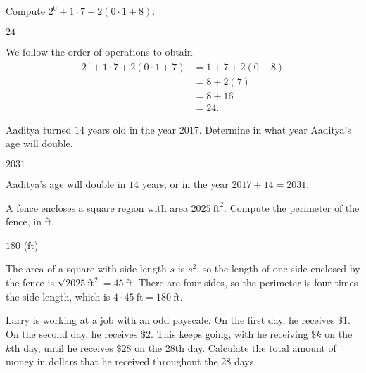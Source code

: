 \documentclass[11pt]{article}
\begin{document}
\setlength{\parindent}{0pt}

\begin{problem}
Compute $2^0 + 1 \cdot 7 + 2(0 \cdot 1 + 8)$.
\end{problem}

\begin{answer}
$\boxed{24}$
\end{answer}

\begin{solution}
We follow the order of operations to obtain
\begin{align*}
2^0 + 1 \cdot 7 + 2(0 \cdot 1 + 7) &= 1 + 7 + 2(0 + 8) \\
&= 8 + 2(7) \\ 
&= 8 + 16 \\
&= \boxed{24}.
\end{align*}
\end{solution}


\begin{problem}
Aaditya turned $14$ years old in the year 2017. Determine in what year Aaditya's age will double.
\end{problem}

\begin{answer}
$\boxed{2031}$
\end{answer}

\begin{solution}
Aaditya's age will double in $14$ years, or in the year $2017 + 14 = \boxed{2031}$.
\end{solution}


\begin{problem}
A fence encloses a square region with area $2025\ \text{ft}^2$. Compute the perimeter of the fence, in ft.
\end{problem}

\begin{answer}
$\boxed{180}$ (ft)
\end{answer}

\begin{solution}
The area of a square with side length $s$ is $s^2$, so the length of one side enclosed by the fence is
$\sqrt{2025\ \text{ft}^2} = 45\ \text{ft}$. There are four sides, so the perimeter is four times the side
length, which is $4 \cdot 45\ \text{ft} = \boxed{180}\ \text{ft}$.
\end{solution}


\begin{problem}
Larry is working at a job with an odd payscale. On the first day, he receives $\$1$.
On the second day, he receives $\$2$. This keeps going, with he receiving $\$k$ on
the $k$th day, until he receives $\$28$ on the $28$th day. Calculate the total amount
of money in dollars that he received throughout the 28 days.
\end{problem}
\end{document}
